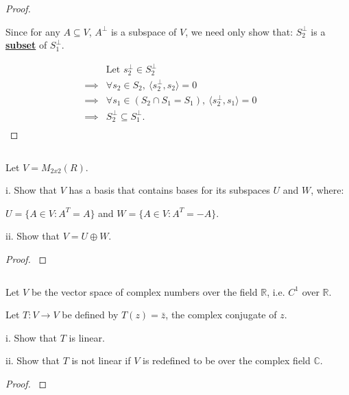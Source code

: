 \documentclass{article}
\newenvironment{customthm}[1]
  {\renewcommand\theinnercustomthm{#1}\innercustomthm}
  {\endinnercustomthm}
\begin{document}
\begin{proof}
  $ $

  Since for any $A \subseteq V$, $A^\perp$ is a subspace of $V$, we need only show that: $S^\perp_2$ is a \textbf{{\underline{subset}}} of $S^\perp_1$.

  \begin{align*}
    & \text{Let } s^\perp_2 \in S^\perp_2 &&\\
    \implies & \forall s_2 \in S_2, \:
    \langle
      s^\perp_2, s_2
    \rangle = 0 &&\\
    \implies & \forall s_1 \in (S_2 \cap S_1 = S_1), \:
    \langle
      s^\perp_2, s_1
    \rangle = 0 &&\\
    \implies & S^\perp_2 \subseteq S^\perp_1. &&\\
  \end{align*}


\end{proof}
\newpage


\begin{customthm}{13}[2022.S(1.B)]
  $ $

  Let $V=M_{2x2}(R)$.
  
  i. Show that $V$ has a basis that contains bases for its subspaces $U$ and $W$, where:
  
  \qquad $U = \{ A \in V: A^T = A \}$ and $W = \{ A \in V: A^T = -A \}$.

  ii. Show that $V = U \oplus W$.
\end{customthm}

\begin{proof}
  $ $

  


\end{proof}
\newpage


\begin{customthm}{14}[2022.S(1.D)]
  $ $

  Let $V$ be the vector space of complex numbers over the field $\mathbb{R}$, i.e. $C^1$ over $\mathbb{R}$.

  Let $T: V \rightarrow V$ be defined by $T(z) = \bar{z}$, the complex conjugate of $z$.

  i. Show that $T$ is linear.

  ii. Show that $T$ is not linear if $V$ is redefined to be over the complex field $\mathbb{C}$.
\end{customthm}

\begin{proof}
  $ $

  


\end{proof}
\newpage
\end{document}
